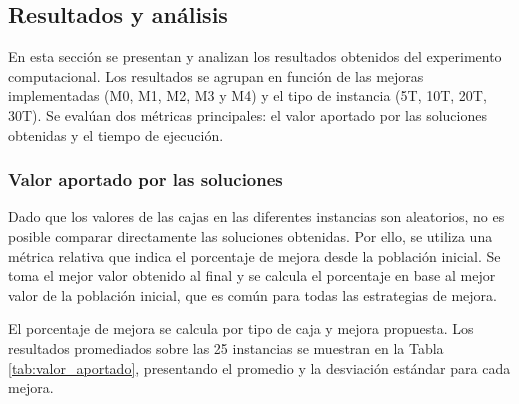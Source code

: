 \subsection{Resultados y análisis}

En esta sección se presentan y analizan los resultados obtenidos del experimento computacional. Los resultados se agrupan en función de las mejoras implementadas (M0, M1, M2, M3 y M4) y el tipo de instancia (5T, 10T, 20T, 30T). Se evalúan dos métricas principales: el valor aportado por las soluciones obtenidas y el tiempo de ejecución.

\subsubsection{Valor aportado por las soluciones}

Dado que los valores de las cajas en las diferentes instancias son aleatorios, no es posible comparar directamente las soluciones obtenidas. Por ello, se utiliza una métrica relativa que indica el porcentaje de mejora desde la población inicial. Se toma el mejor valor obtenido al final y se calcula el porcentaje en base al mejor valor de la población inicial, que es común para todas las estrategias de mejora.

El porcentaje de mejora se calcula por tipo de caja y mejora propuesta. Los resultados promediados sobre las 25 instancias se muestran en la Tabla \ref{tab:valor_aportado}, presentando el promedio y la desviación estándar para cada mejora.

